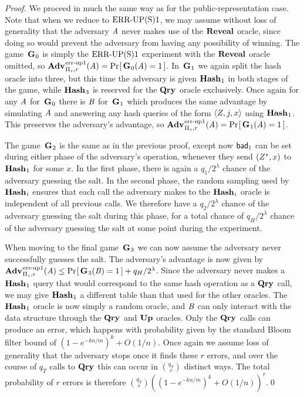 \begin{proof} We proceed in much the same way as for the public-representation case. Note that when we reduce to $\textnormal{ERR\mbox{-}UP(S)}1$, we may assume without loss of generality that the adversary $\mathit{A}$ never makes use of the $\mathbf{Reveal}$ oracle, since doing so would prevent the adversary from having any possibility of winning. The game~$\mathbf{G}\hspace{0.5pt}_0$ is simply the $\textnormal{ERR\mbox{-}UP(S)}1$ experiment with the $\mathbf{Reveal}$ oracle omitted, so $\Adv{\errep1}_{\struct_s,r}(\advA) = \Prob{\G_0(\advA) = 1}$. In~$\mathbf{G}\hspace{0.5pt}_1$ we again split the hash oracle into three, but this time the adversary is given $\mathbf{Hash}\hspace{0.5pt}_1$ in both stages of the game, while $\mathbf{Hash}\hspace{0.5pt}_3$ is reserved for the $\mathbf{Qry}\hspace{0.5pt}$ oracle exclusively. Once again for any $\mathit{A}$ for~$\mathbf{G}\hspace{0.5pt}_0$ there is $\mathit{B}$ for~$\mathbf{G}\hspace{0.5pt}_1$ which produces the same advantage by simulating $\mathit{A}$ and answering any hash queries of the form $\langle Z, j, x\rangle$ using $\mathbf{Hash}\hspace{0.5pt}_1$. This preserves the adversary's advantage, so $\Adv{\errep1}_{\struct_s,r}(\advA) = \Prob{\G_1(\advA) = 1}$.

The game~$\mathbf{G}\hspace{0.5pt}_2$ is the same as in the previous proof, except now $\mathsf{bad}_1$ can be set during either phase of the adversary's operation, whenever they send $(Z^*,x)$ to $\mathbf{Hash}\hspace{0.5pt}_1$ for some $x$. In the first phase, there is again a $q_1/2^\lambda$ chance of the adversary guessing the salt. In the second phase, the random sampling used by $\mathbf{Hash}\hspace{0.5pt}_i$ ensures that each call the adversary makes to the $\mathbf{Hash}\hspace{0.5pt}_i$ oracle is independent of all previous calls. We therefore have a $q_2/2^\lambda$ chance of the adversary guessing the salt during this phase, for a total chance of $q_H/2^\lambda$ chance of the adversary guessing the salt at some point during the experiment.

When moving to the final game~$\mathbf{G}\hspace{0.5pt}_3$ we can now assume the adversary never successfully guesses the salt. The adversary's advantage is now given by $\Adv{\errep1}_{\struct_s,r}(\advA) \le \Prob{\G_3(\advB) = 1} + q_H/2^\lambda$. Since the adversary never makes a $\mathbf{Hash}\hspace{0.5pt}_1$ query that would correspond to the same hash operation as a $\mathbf{Qry}\hspace{0.5pt}$ call, we may give $\mathbf{Hash}\hspace{0.5pt}_1$ a different table than that used for the other oracles. The $\mathbf{Hash}\hspace{0.5pt}_1$ oracle is now simply a random oracle, and $\mathit{B}$ can only interact with the data structure through the $\mathbf{Qry}\hspace{0.5pt}$ and $\mathbf{Up}\hspace{0.5pt}$ oracles. Only the $\mathbf{Qry}\hspace{0.5pt}$ calls can produce an error, which happens with probability given by the standard Bloom filter bound of $(1-e^{-kn/m})^k + O(1/n)$. Once again we assume loss of generality that the adversary stops once it finds these $r$ errors, and over the course of $q_T$ calls to $\mathbf{Qry}\hspace{0.5pt}$ this can occur in $\binom{q_T}{r}$ distinct ways. The total probability of $r$ errors is therefore $\binom{q_T}{r}\left((1-e^{-kn/m})^k + O(1/n)\right)^r$.\hfill\qed
\end{proof}

